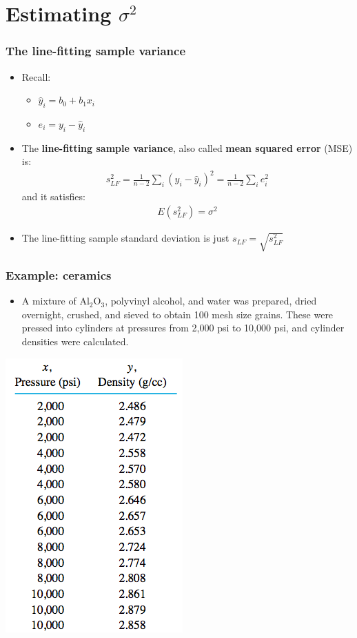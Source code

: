 \documentclass[handout]{beamer}\usepackage[]{graphicx}\usepackage[]{color}
\providecommand{\wh}[1]{\widehat{#1}}
\numberwithin{equation}{section}
\begin{document}
\section{Estimating $\sigma^2$}

\begin{frame}
\frametitle{The line-fitting sample variance}
\begin{itemize}
\item Recall:
\begin{itemize}
\item $\wh{y}_i = b_0 + b_1 x_i $
\pause \item $e_i = y_i - \wh{y}_i$
\end{itemize}
\pause \item The {\bf line-fitting sample variance}, also called {\bf mean squared error} (MSE) is:
\pause \begin{align*}
s_{LF}^2 = \frac{1}{n-2}\sum_i (y_i - \wh{y}_i)^2 = \frac{1}{n-2} \sum_i e_i^2
\end{align*}
\pause and it satisfies:
\pause \begin{align*}
E(s_{LF}^2) = \sigma^2
\end{align*}
\pause \item The line-fitting sample standard deviation is just $s_{LF} = \sqrt{s_{LF}^2}$
\end{itemize}
\end{frame}


\begin{frame}
\frametitle{Example: ceramics} \small
\begin{itemize}
\item A mixture of Al${}_2$O${}_3$, polyvinyl alcohol, and water was prepared, dried overnight, crushed, and sieved to obtain 100 mesh size grains. These were pressed into cylinders at pressures from 2,000 psi to 10,000 psi, and cylinder densities were calculated.
\end{itemize}
\begin{center}
 \includegraphics{../../fig/ceramicdat.png}
\end{center}
\end{frame}
\end{document}

